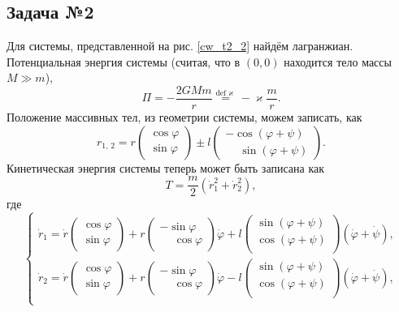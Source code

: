 \subsection*{Задача №2}

Для системы, представленной на рис. \ref{cw_t2_2} найдём лагранжиан. Потенциальная энергия системы (считая, что в $(0,0)$ находится тело массы $M \gg m$),
\begin{equation*}
    \Pi = - \frac{2GMm}{r} \overset{\mathrm{def} \varkappa}{=} - \varkappa \frac{m}{r} .
\end{equation*}
Положение массивных тел, из геометрии системы, можем записать, как
\begin{equation*}
    r_{1,\,2} = r \begin{pmatrix}
        \cos \varphi \\
        \sin \varphi 
    \end{pmatrix} 
    \pm l \begin{pmatrix}
        - \cos (\varphi + \psi) \\
        \phantom{-} \sin (\varphi + \psi)
    \end{pmatrix}.
\end{equation*}
Кинетическая энергия системы теперь может быть записана как
\begin{equation*}
    T = \frac{m}{2} \left(
        \dot{r}^2_1 + \dot{r}^2_2
    \right),
\end{equation*}
где
\begin{equation}
\left\{\begin{aligned}
    \dot{r}_1 = \dot{r} \begin{pmatrix}
        \cos \varphi \\
        \sin \varphi  
    \end{pmatrix} + r \begin{pmatrix}
        - \sin \varphi \\
        \phantom{-}  \cos \varphi
    \end{pmatrix}
    \dot{\varphi} + 
    l \begin{pmatrix}
        \sin (\varphi + \psi) \\
        \cos (\varphi + \psi) \\
    \end{pmatrix} (\dot{\varphi} + \dot{\psi}), \\
    \dot{r}_2 = \dot{r} \begin{pmatrix}
        \cos \varphi \\
        \sin \varphi  
    \end{pmatrix} + r \begin{pmatrix}
        - \sin \varphi \\
        \phantom{-}  \cos \varphi
    \end{pmatrix}
    \dot{\varphi} - 
    l \begin{pmatrix}
        \sin (\varphi + \psi) \\
        \cos (\varphi + \psi) \\
    \end{pmatrix} (\dot{\varphi} + \dot{\psi}), \\
\end{aligned}\right.
\end{equation}
